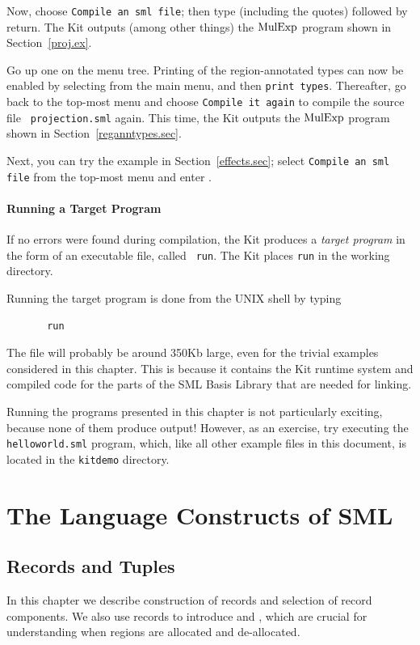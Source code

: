 \documentclass[12pt]{book}
\begin{document}
Now, choose \texttt{Compile an sml file}; then type
 (including the quotes) followed by return.
The Kit outputs (among other things) the $\hbox{\rm MulExp}$ program shown in
Section~\ref{proj.ex}.

Go up one on the menu tree.  Printing of the region-annotated types
can now be enabled by selecting  from the main menu, and
then \texttt{print types}.  Thereafter, go back to the top-most menu
and choose \texttt{Compile it again} to compile the source file {\tt
  projection.sml} again. This time, the Kit outputs the $\hbox{\rm MulExp}$
program shown in Section~\ref{reganntypes.sec}.

Next, you can try the example in Section~\ref{effects.sec}; select
\texttt{Compile an sml file} from the top-most menu and enter
.


\subsection{Running a Target Program}
If no errors were found during compilation, the Kit produces a
%
{\em target program} in the form of an executable file, called {\tt
  run}. The Kit places {\tt run} in the working directory.

Running the target program is done from the UNIX shell by typing 
\begin{verbatim}
       run
\end{verbatim}
The file will probably be around 350Kb large, even for the trivial
examples considered in this chapter.  This is because it contains the
Kit runtime system and compiled code for the parts of the SML Basis
Library that are needed for linking.

Running the programs presented in this chapter is not particularly
exciting, because none of them produce output! However, as an
exercise, try executing the 
%
{\tt helloworld.sml} program, which, like all other example files in
this document, is located in the
%
{\tt kitdemo} directory.


\part{The Language Constructs of SML}
\label{understanding.sec}
\chapter{Records and Tuples}
\label{records.sec}
In this chapter we describe construction of records and selection of record
components. We also use records to introduce   and , which are crucial for understanding when regions are allocated
and de-allocated.
\end{document}
